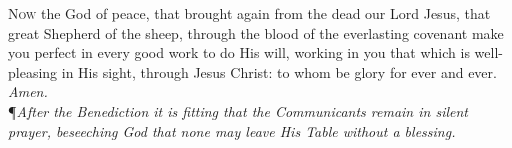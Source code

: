 \lettrine{N}{ow} the God of peace, that brought again from the dead our Lord Jesus, that great Shepherd of the sheep, through the blood of the everlasting covenant make you perfect in every good work to do His will, working in you that which is well-pleasing in His sight, through Jesus Christ: to whom be glory for ever and ever.
\textit{Amen.} \\ 

\noindent\P\textit{After the Benediction it is fitting that the Communicants remain in silent prayer, beseeching God that none may leave His Table without a blessing.} 

